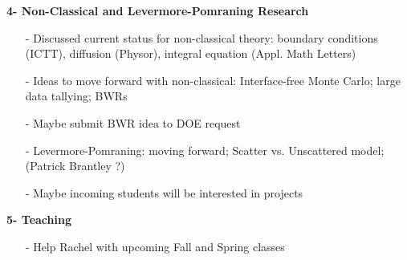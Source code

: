 \documentclass[12pt]{article}
\begin{document}
\noindent\textbf{4- Non-Classical and Levermore-Pomraning Research}
\begin{itemize}
\item[-] Discussed current status for non-classical theory: boundary conditions (ICTT), diffusion (Physor), integral equation (Appl. Math Letters)
\item[-] Ideas to move forward with non-classical: Interface-free Monte Carlo; large data tallying; BWRs
\item[-] Maybe submit BWR idea to DOE request
\item[-] Levermore-Pomraning: moving forward; Scatter vs. Unscattered model; (Patrick Brantley ?)
\item[-] Maybe incoming students will be interested in projects
\end{itemize}

\noindent\textbf{5- Teaching}
\begin{itemize}
\item[-] Help Rachel with upcoming Fall and Spring classes
\end{itemize}
\end{document}
